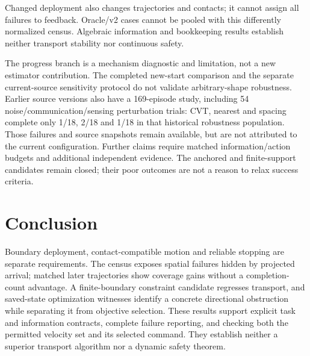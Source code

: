 \documentclass[letterpaper,10pt,conference]{ieeeconf}
\begin{document}
Changed deployment also changes trajectories and contacts; it cannot assign all failures to feedback. Oracle/v2 cases cannot be pooled with this differently normalized census. Algebraic information and bookkeeping results establish neither transport stability nor continuous safety.

The progress branch is a mechanism diagnostic and limitation, not a new estimator contribution. The completed new-start comparison and the separate current-source sensitivity protocol do not validate arbitrary-shape robustness. Earlier source versions also have a 169-episode study, including 54 noise/communication/sensing perturbation trials: CVT, nearest and spacing complete only 1/18, 2/18 and 1/18 in that historical robustness population. Those failures and source snapshots remain available, but are not attributed to the current configuration. Further claims require matched information/action budgets and additional independent evidence. The anchored and finite-support candidates remain closed; their poor outcomes are not a reason to relax success criteria.

\section{Conclusion}
Boundary deployment, contact-compatible motion and reliable stopping are separate requirements. The census exposes spatial failures hidden by projected arrival; matched later trajectories show coverage gains without a completion-count advantage. A finite-boundary constraint candidate regresses transport, and saved-state optimization witnesses identify a concrete directional obstruction while separating it from objective selection. These results support explicit task and information contracts, complete failure reporting, and checking both the permitted velocity set and its selected command. They establish neither a superior transport algorithm nor a dynamic safety theorem.

\balance

\end{document}
